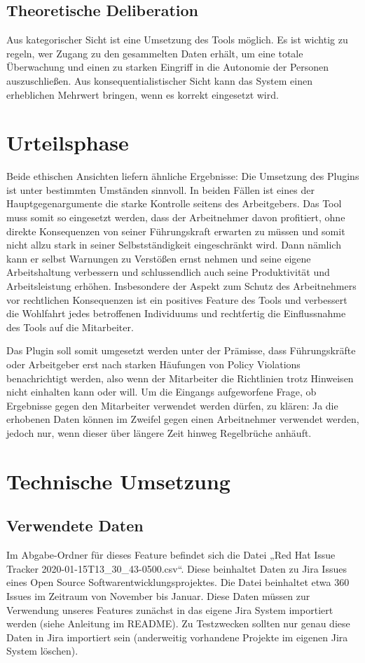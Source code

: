 \documentclass[a4paper,12pt,]{article}
\begin{document}
\subsection{Theoretische Deliberation}
Aus kategorischer Sicht ist eine Umsetzung des Tools möglich. Es ist wichtig zu regeln, wer Zugang zu den gesammelten Daten erhält, um eine totale Überwachung und einen zu starken Eingriff in die Autonomie der Personen auszuschließen.
Aus konsequentialistischer Sicht kann das System einen erheblichen Mehrwert bringen, wenn es korrekt eingesetzt wird.

\section{Urteilsphase}

Beide ethischen Ansichten liefern ähnliche Ergebnisse: Die Umsetzung des Plugins ist unter bestimmten Umständen sinnvoll. In beiden Fällen ist eines der Hauptgegenargumente die starke Kontrolle seitens des Arbeitgebers. Das Tool muss somit so eingesetzt werden, dass der Arbeitnehmer davon profitiert, ohne direkte Konsequenzen von seiner Führungskraft erwarten zu müssen und somit nicht allzu stark in seiner Selbstständigkeit eingeschränkt wird. Dann nämlich kann er selbst Warnungen zu Verstößen ernst nehmen und seine eigene Arbeitshaltung verbessern und schlussendlich auch seine Produktivität und Arbeitsleistung erhöhen.
Insbesondere der Aspekt zum Schutz des Arbeitnehmers vor rechtlichen Konsequenzen ist ein positives Feature des Tools und verbessert die Wohlfahrt jedes betroffenen Individuums und rechtfertig die Einflussnahme des Tools auf die Mitarbeiter.

Das Plugin soll somit umgesetzt werden unter der Prämisse, dass Führungskräfte oder Arbeitgeber erst nach starken Häufungen von Policy Violations benachrichtigt werden, also wenn der Mitarbeiter die Richtlinien trotz Hinweisen nicht einhalten kann oder will. Um die Eingangs aufgeworfene Frage, ob Ergebnisse gegen den Mitarbeiter verwendet werden dürfen, zu klären: Ja die erhobenen Daten können im Zweifel gegen einen Arbeitnehmer verwendet werden, jedoch nur, wenn dieser über längere Zeit hinweg Regelbrüche anhäuft.

\section{Technische Umsetzung}

\subsection{Verwendete Daten}
Im Abgabe-Ordner für dieses Feature befindet sich die Datei „Red Hat Issue Tracker 2020-01-15T13\_30\_43-0500.csv“. Diese beinhaltet Daten zu Jira Issues eines Open Source Softwarentwicklungsprojektes. Die Datei beinhaltet etwa 360 Issues im Zeitraum von November bis Januar.  Diese Daten müssen zur Verwendung unseres Features zunächst in das eigene Jira System importiert werden (siehe Anleitung im README). Zu Testzwecken sollten nur genau diese Daten in Jira importiert sein (anderweitig vorhandene Projekte im eigenen Jira System löschen).
\end{document}
